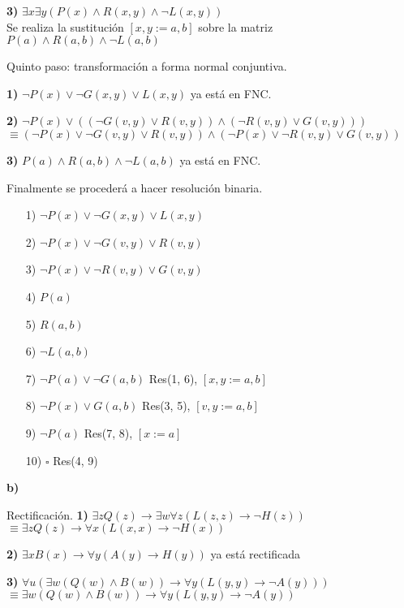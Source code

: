 \documentclass{article}
\begin{document}
\textbf{3)} $\exists x \exists y ( P(x) \land R(x, y) \land \lnot L(x, y) )$\\
Se realiza la sustitución $[x,y := a, b]$ sobre la matriz\\
$ P(a) \land R(a, b) \land \lnot L(a, b) $

Quinto paso: transformación a forma normal conjuntiva.

\textbf{1)} $\lnot P(x) \lor \lnot G(x, y) \lor L(x, y)$ ya está en FNC.

\textbf{2)} $\lnot P(x) \lor ((\lnot G(v, y) \lor R(v, y)) \land (\lnot R(v, y) \lor G(v, y)))$\\
$\equiv (\lnot P(x) \lor \lnot G(v, y) \lor R(v, y)) \land (\lnot P(x) \lor \lnot R(v, y) \lor G(v, y))$

\textbf{3)} $P(a) \land R(a, b) \land \lnot L(a, b)$ ya está en FNC.

Finalmente se procederá a hacer resolución binaria.

\begin{itemize}
\item[1)] $\lnot P(x) \lor \lnot G(x, y) \lor L(x, y)$
\item[2)] $\lnot P(x) \lor \lnot G(v, y) \lor R(v, y)$
\item[3)] $\lnot P(x) \lor \lnot R(v, y) \lor G(v, y)$
\item[4)] $P(a)$
\item[5)] $R(a, b)$
\item[6)] $\lnot L(a, b)$
\item[7)] $\lnot P(a) \lor \lnot G(a,b)$ Res(1, 6), $[x,y := a, b]$
\item[8)] $\lnot P(x) \lor G(a, b)$ Res(3, 5), $[v,y := a,b]$
\item[9)] $\lnot P(a)$ Res(7, 8), $[x := a]$
\item[10)] $\square$ Res(4, 9)
\end{itemize}

\textbf{b)}

Rectificación.
\textbf{1)} $\exists z Q(z) \rightarrow \exists w \forall z (L(z,z) \rightarrow \lnot H(z))$\\
$\equiv \exists z Q(z) \rightarrow \forall x (L(x,x) \rightarrow \lnot H(x))$

\textbf{2)} $\exists x B(x) \rightarrow \forall y (A(y) \rightarrow H(y))$ ya está rectificada

\textbf{3)} $\forall u (\exists w (Q(w) \land B(w)) \rightarrow \forall y (L(y,y) \rightarrow \lnot A(y)))$\\
$\equiv \exists w (Q(w) \land B(w)) \rightarrow \forall y (L(y,y) \rightarrow \lnot A(y))$
\end{document}
